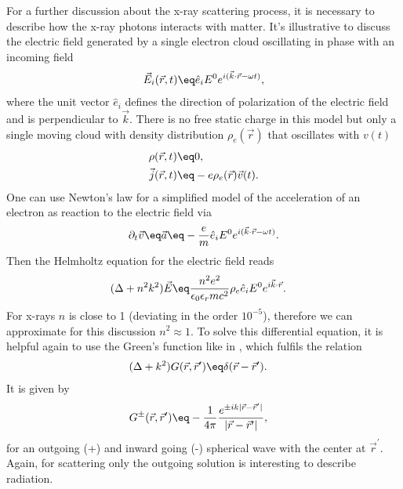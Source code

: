 \documentclass[\main/dresen_thesis.tex]{subfiles}
\begin{document}
For a further discussion about the x-ray scattering process, it is necessary to describe how the x-ray photons interacts with matter.
It's illustrative to discuss the electric field generated by a single electron cloud oscillating in phase with an incoming field
\begin{align}
  \vec{E}_i (\vec{r}, t) \eq \hat{e}_i E^0 e^{i (\vec{k} \cdot \vec{r} - \omega t)},
\end{align}
where the unit vector $\hat{e}_i$ defines the direction of polarization of the electric field and is perpendicular to $\vec{k}$.
There is no free static charge in this model but only a single moving cloud with density distribution $\rho_e(\vec{r})$ that oscillates with $v(t)$
\begin{align}
  \rho (\vec{r}, t) \eq& 0,\\
  \vec{j} (\vec{r}, t) \eq& -e \rho_e(\vec{r}) \vec{v} (t).
\end{align}
One can use Newton's law for a simplified model of the acceleration of an electron as reaction to the electric field via
\begin{align}
  \partial_t \vec{v} \eq \vec{a} \eq -\frac{e}{m} \hat{e}_i E^0 e^{i(\vec{k}\cdot \vec{r} - \omega t)}.
\end{align}
Then the Helmholtz equation for the electric field reads
\begin{align}
  (\Delta + n^2 k^2 )\vec{E} \eq& \frac{n^2 e^2}{\epsilon_0 \epsilon_r m c^2} \rho_e \hat{e}_i E^0 e^{i\vec{k}\cdot \vec{r}}.
\end{align}
For x-rays $n$ is close to 1 (deviating in the order $10^{-5}$), therefore we can approximate for this discussion $n^2 \approx 1$.
To solve this differential equation, it is helpful again to use the Green's function like in , which fulfils the relation
\begin{align}
  (\Delta + k^2) G(\vec{r}, \vec{r}^\prime) \eq& \delta(\vec{r} - \vec{r}^\prime).
\end{align}
It is given by \cite{Jackson_1999_Class}
\begin{align}
  G^{\pm}(\vec{r}, \vec{r}^\prime) \eq& - \frac{1}{4\pi} \frac{e^{\pm i k |\vec{r} - \vec{r}^\prime|}}{|\vec{r} - \vec{r}^\prime|},
\end{align}
for an outgoing (+) and inward going (-) spherical wave with the center at $\vec{r}^\prime$. Again, for scattering only the outgoing solution is interesting to describe radiation.
\end{document}
